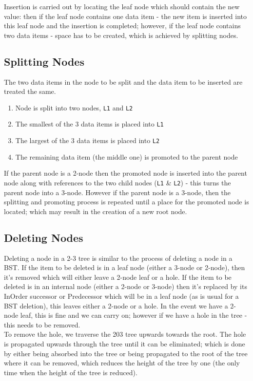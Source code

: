 Insertion is carried out by locating the leaf node which should contain the new value: then if the leaf node contains one data item - the new item is inserted into this leaf node and the insertion is completed; however, if the leaf node contains two data items - space has to be created, which is achieved by splitting nodes.

\subsection{Splitting Nodes}
The two data items in the node to be split and the data item to be inserted are treated the same.
\begin{enumerate}
    \item Node is split into two nodes, \verb|L1| and \verb|L2|
    \item The smallest of the 3 data items is placed into \verb|L1|
    \item The largest of the 3 data items is placed into \verb|L2|
    \item The remaining data item (the middle one) is promoted to the parent node
\end{enumerate}

If the parent node is a 2-node then the promoted node is inserted into the parent node along with references to the two child nodes (\verb|L1| \& \verb|L2|) - this turns the parent node into a 3-node. However if the parent node is a 3-node, then the splitting and promoting process is repeated until a place for the promoted node is located; which may result in the creation of a new root node.

\subsection{Deleting Nodes}
Deleting a node in a 2-3 tree is similar to the process of deleting a node in a BST. If the item to be deleted is in a leaf node (either a 3-node or 2-node), then it's removed which will either leave a 2-node leaf or a hole. If the item to be deleted is in an internal node (either a 2-node or 3-node) then it's replaced by its InOrder successor or Predecessor which will be in a leaf node (as is usual for a BST deletion), this leaves either a 2-node or a hole. In the event we have a 2-node leaf, this is fine and we can carry on; however if we have a hole in the tree - this needs to be removed.\\

To remove the hole, we traverse the 203 tree upwards towards the root. The hole is propagated upwards through the tree until it can be eliminated; which is done by either being absorbed into the tree or being propagated to the root of the tree where it can be removed, which reduces the height of the tree by one (the only time when the height of the tree is reduced). 

